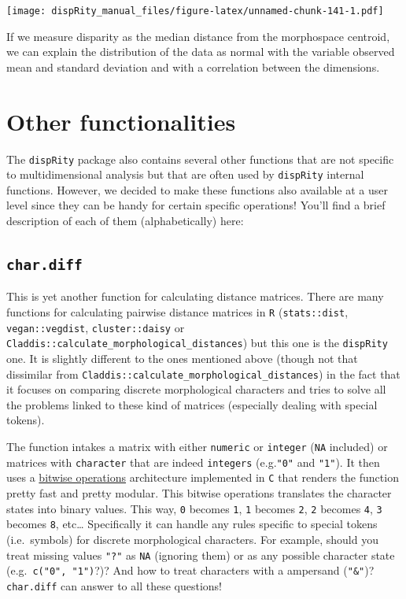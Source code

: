 \documentclass[
]{book}
\begin{document}
\texttt{[image: dispRity\_manual\_files/figure-latex/unnamed-chunk-141-1.pdf]}

If we measure disparity as the median distance from the morphospace centroid, we can explain the distribution of the data as normal with the variable observed mean and standard deviation and with a correlation between the dimensions.

\hypertarget{other-functionalities}{%
\chapter{Other functionalities}\label{other-functionalities}}

The \texttt{dispRity} package also contains several other functions that are not specific to multidimensional analysis but that are often used by \texttt{dispRity} internal functions.
However, we decided to make these functions also available at a user level since they can be handy for certain specific operations!
You'll find a brief description of each of them (alphabetically) here:

\hypertarget{char.diff}{%
\section{\texorpdfstring{\texttt{char.diff}}{char.diff}}\label{char.diff}}

This is yet another function for calculating distance matrices.
There are many functions for calculating pairwise distance matrices in \texttt{R} (\texttt{stats::dist}, \texttt{vegan::vegdist}, \texttt{cluster::daisy} or \texttt{Claddis::calculate\_morphological\_distances}) but this one is the \texttt{dispRity} one.
It is slightly different to the ones mentioned above (though not that dissimilar from \texttt{Claddis::calculate\_morphological\_distances}) in the fact that it focuses on comparing discrete morphological characters and tries to solve all the problems linked to these kind of matrices (especially dealing with special tokens).

The function intakes a matrix with either \texttt{numeric} or \texttt{integer} (\texttt{NA} included) or matrices with \texttt{character} that are indeed \texttt{integers} (e.g.\texttt{"0"} and \texttt{"1"}).
It then uses a \href{https://en.wikipedia.org/wiki/Bitwise_operations_in_C}{bitwise operations} architecture implemented in \texttt{C} that renders the function pretty fast and pretty modular.
This bitwise operations translates the character states into binary values.
This way, \texttt{0} becomes \texttt{1}, \texttt{1} becomes \texttt{2}, \texttt{2} becomes \texttt{4}, \texttt{3} becomes \texttt{8}, etc\ldots{}
Specifically it can handle any rules specific to special tokens (i.e.~symbols) for discrete morphological characters. For example, should you treat missing values \texttt{"?"} as \texttt{NA} (ignoring them) or as any possible character state (e.g.~\texttt{c("0",\ "1")}?)? And how to treat characters with a ampersand (\texttt{"\&"})? \texttt{char.diff} can answer to all these questions!
\end{document}
